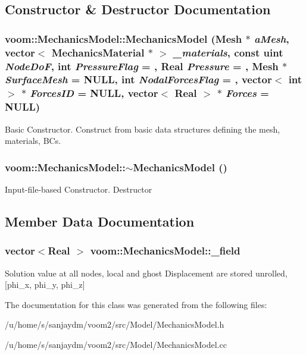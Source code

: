 \subsection{Constructor \& Destructor Documentation}
\hypertarget{classvoom_1_1_mechanics_model_a31aa527928bf219f41a69c390e75ee4f}{
\subsubsection[{MechanicsModel}]{\setlength{\rightskip}{0pt plus 5cm}voom::MechanicsModel::MechanicsModel ({\bf Mesh} $\ast$ {\em aMesh}, \/  vector$<$ {\bf MechanicsMaterial} $\ast$ $>$ {\em \_\-materials}, \/  const uint {\em NodeDoF}, \/  int {\em PressureFlag} = {}, \/  Real {\em Pressure} = {}, \/  {\bf Mesh} $\ast$ {\em SurfaceMesh} = {\ttfamily NULL}, \/  int {\em NodalForcesFlag} = {}, \/  vector$<$ int $>$ $\ast$ {\em ForcesID} = {\ttfamily NULL}, \/  vector$<$ Real $>$ $\ast$ {\em Forces} = {\ttfamily NULL})}}
\label{classvoom_1_1_mechanics_model_a31aa527928bf219f41a69c390e75ee4f}


Basic Constructor. Construct from basic data structures defining the mesh, materials, BCs. \hypertarget{classvoom_1_1_mechanics_model_a39cab4fab5f26d8bf83e63a6d91e33f6}{
\subsubsection[{$\sim$MechanicsModel}]{\setlength{\rightskip}{0pt plus 5cm}voom::MechanicsModel::$\sim$MechanicsModel ()}}
\label{classvoom_1_1_mechanics_model_a39cab4fab5f26d8bf83e63a6d91e33f6}


Input-\/file-\/based Constructor. Destructor 

\subsection{Member Data Documentation}
\hypertarget{classvoom_1_1_mechanics_model_a0c96adf9c1e07f5b604a3db9ffe9b750}{
\subsubsection[{\_\-field}]{\setlength{\rightskip}{0pt plus 5cm}vector$<$Real $>$ {\bf voom::MechanicsModel::\_\-field}}}
\label{classvoom_1_1_mechanics_model_a0c96adf9c1e07f5b604a3db9ffe9b750}
Solution value at all nodes, local and ghost Displacement are stored unrolled, \mbox{[}phi\_\-x, phi\_\-y, phi\_\-z\mbox{]} 

The documentation for this class was generated from the following files:\begin{DoxyCompactItemize}
\item 
/u/home/s/sanjaydm/voom2/src/Model/MechanicsModel.h\item 
/u/home/s/sanjaydm/voom2/src/Model/MechanicsModel.cc\end{DoxyCompactItemize}
